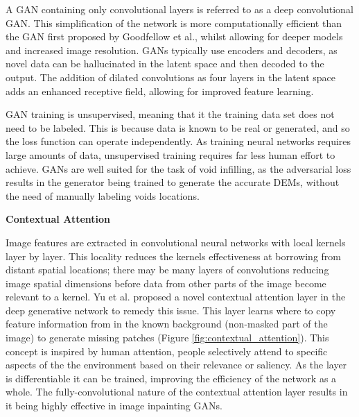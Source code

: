 \documentclass[twocolumn]{article}
\begin{document}
A GAN containing only convolutional layers is referred to as a deep convolutional GAN\autocite{radfordUnsupervisedRepresentationLearning2016}.
This simplification of the network is more computationally efficient than the GAN first proposed by Goodfellow et al.\autocite{goodfellowGenerativeAdversarialNetworks2020}, whilst allowing for deeper models and increased image resolution.
GANs typically use encoders and decoders, as novel data can be hallucinated in the latent space and then decoded to the output.
The addition of dilated convolutions\autocite{yuMultiScaleContextAggregation2016} as four layers in the latent space adds an enhanced receptive field, allowing for improved feature learning.

GAN training is unsupervised, meaning that it the training data set does not need to be labeled.
This is because data is known to be real or generated, and so the loss function can operate independently.
As training neural networks requires large amounts of data, unsupervised training requires far less human effort to achieve.
GANs are well suited for the task of void infilling, as the adversarial loss results in the generator being trained to generate the accurate DEMs, without the need of manually labeling voids locations.

\textbf{Contextual Attention}

Image features are extracted in convolutional neural networks with local kernels layer by layer.
This locality reduces the kernels effectiveness at borrowing from distant spatial locations; there may be many layers of convolutions reducing image spatial dimensions before data from other parts of the image become relevant to a kernel.
Yu et al.\autocite{yuGenerativeImageInpainting2018} proposed a novel contextual attention layer in the deep generative network to remedy this issue.
This layer learns where to copy feature information from in the known background (non-masked part of the image) to generate missing patches (Figure \ref{fig:contextual_attention}).
This concept is inspired by human attention, people selectively attend to specific aspects of the the environment based on their relevance or saliency.
As the layer is differentiable it can be trained, improving the efficiency of the network as a whole.
The fully-convolutional nature of the contextual attention layer results in it being highly effective in image inpainting GANs.
\end{document}
